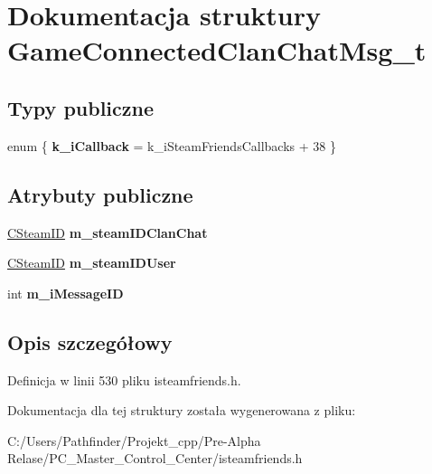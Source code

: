 \hypertarget{struct_game_connected_clan_chat_msg__t}{}\section{Dokumentacja struktury Game\+Connected\+Clan\+Chat\+Msg\+\_\+t}
\label{struct_game_connected_clan_chat_msg__t}
\subsection*{Typy publiczne}
\begin{DoxyCompactItemize}
\item 
\mbox{\label{struct_game_connected_clan_chat_msg__t_abbd8179f369c04adeff43aef40f47f27}} 
enum \{ {\bfseries k\+\_\+i\+Callback} = k\+\_\+i\+Steam\+Friends\+Callbacks + 38
 \}
\end{DoxyCompactItemize}
\subsection*{Atrybuty publiczne}
\begin{DoxyCompactItemize}
\item 
\mbox{\label{struct_game_connected_clan_chat_msg__t_a541dfce1dbab9e98bcadb4aa1bae6388}} 
\hyperlink{class_c_steam_i_d}{C\+Steam\+ID} {\bfseries m\+\_\+steam\+I\+D\+Clan\+Chat}
\item 
\mbox{\label{struct_game_connected_clan_chat_msg__t_a9c435bfbf38c17693079add735c1dd82}} 
\hyperlink{class_c_steam_i_d}{C\+Steam\+ID} {\bfseries m\+\_\+steam\+I\+D\+User}
\item 
\mbox{\label{struct_game_connected_clan_chat_msg__t_a4b5c3326e5a9b9eb196ff11fc896a709}} 
int {\bfseries m\+\_\+i\+Message\+ID}
\end{DoxyCompactItemize}


\subsection{Opis szczegółowy}


Definicja w linii 530 pliku isteamfriends.\+h.



Dokumentacja dla tej struktury została wygenerowana z pliku\+:\begin{DoxyCompactItemize}
\item 
C\+:/\+Users/\+Pathfinder/\+Projekt\+\_\+cpp/\+Pre-\/\+Alpha Relase/\+P\+C\+\_\+\+Master\+\_\+\+Control\+\_\+\+Center/isteamfriends.\+h\end{DoxyCompactItemize}
